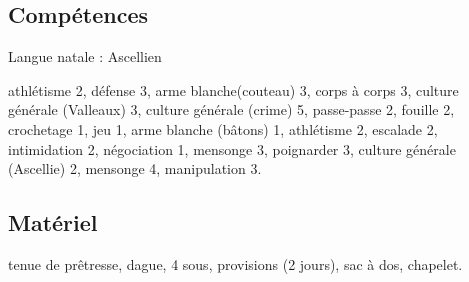 \documentclass[10pt,a4paper]{article}
\begin{document}
\subsection{Compétences}
Langue natale : Ascellien

athlétisme 2, défense 3, arme blanche(couteau) 3, corps à corps 3, culture générale (Valleaux) 3, culture générale (crime) 5, passe-passe 2, fouille 2, crochetage 1, jeu 1, arme blanche (bâtons) 1, athlétisme 2, escalade 2, intimidation 2, négociation 1, mensonge 3, poignarder 3, culture générale (Ascellie) 2, mensonge 4, manipulation 3.
\subsection{Matériel}
tenue de prêtresse, dague, 4 sous, provisions (2 jours), sac à dos, chapelet.
\end{document}
